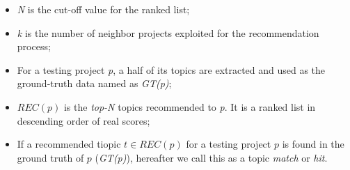 \begin{itemize}[noitemsep,topsep=0pt]
	\item \emph{N} is the cut-off value for the ranked list;%
	\item \emph{k} is the number of neighbor projects exploited for the recommendation process;
	\item For a testing project \emph{p}, a half of its topics are extracted and used as the ground-truth data named as \emph{GT(p)};
	\item $REC(p)$ is the \emph{top-N} topics recommended to \emph{p}. It is a ranked list in descending order of real scores;%
	\item If a recommended tiopic $t \in REC(p)$ for a testing project $p$ is found in the ground truth of $p$ (\ie \emph{GT(p)}), hereafter we call this as a topic \textit{match} or \textit{hit}.	
\end{itemize}	





